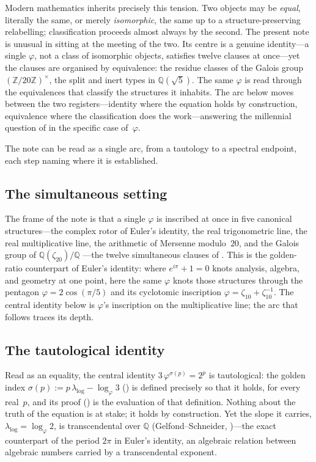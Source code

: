 \documentclass[11pt]{amsart}
\theoremstyle{definition}
\newcommand{\golden}{\varphi}
\newcommand{\Ztwenty}{(\mathbb{Z}/20\mathbb{Z})^{\times}}
\begin{document}
Modern mathematics inherits precisely this tension.  Two objects may be
\emph{equal}, literally the same, or merely \emph{isomorphic}, the same up
to a structure-preserving relabelling; classification proceeds almost always
by the second.  The present note is unusual in sitting at the meeting of the
two.  Its centre is a genuine identity---a single $\golden$, not a class of
isomorphic objects, satisfies twelve clauses at once---yet the clauses are
organised by equivalence: the residue classes of the Galois group
$\Ztwenty$, the split and inert types in $\mathbb{Q}(\sqrt5)$.  The same
$\golden$ is read through the equivalences that classify the structures it
inhabits.  The arc below moves between the two registers---identity where
the equation holds by construction, equivalence where the classification
does the work---answering the millennial question of
 in the specific case of~$\golden$.

The note can be read as a single arc, from a tautology to a spectral
endpoint, each step naming where it is established.

\subsection*{The simultaneous setting}
The frame of the note is that a single $\golden$ is inscribed at once in
five canonical structures---the complex rotor of Euler's identity, the real
trigonometric line, the real multiplicative line, the arithmetic of Mersenne
modulo~$20$, and the Galois group of $\mathbb{Q}(\zeta_{20})/\mathbb{Q}$%
---the twelve simultaneous clauses of .  This is
the golden-ratio counterpart of Euler's identity: where $e^{i\pi}+1=0$ knots
analysis, algebra, and geometry at one point, here the same $\golden$ knots
those structures through the pentagon $\golden=2\cos(\pi/5)$ and its
cyclotomic inscription $\golden=\zeta_{10}+\zeta_{10}^{-1}$.  The central
identity below is $\golden$'s inscription on the multiplicative line; the
arc that follows traces its depth.

\subsection*{The tautological identity}
Read as an equality, the central identity $3\,\golden^{\sigma(p)}=2^{p}$ is
tautological: the golden index
$\sigma(p):=p\,\lambda_{\log}-\log_{\golden}3$ () is defined
precisely so that it holds, for every real~$p$, and its proof
() is the evaluation of that definition.  Nothing about
the truth of the equation is at stake; it holds by construction.  Yet the
slope it carries, $\lambda_{\log}=\log_{\golden}2$, is transcendental over
$\mathbb{Q}$ (Gelfond--Schneider, )---the exact
counterpart of the period $2\pi$ in Euler's identity, an algebraic relation
between algebraic numbers carried by a transcendental exponent.
\end{document}
